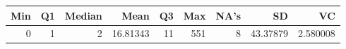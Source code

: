 
\begin{tabular}[t]{rrrrrrrrr}
\toprule
Min & Q1 & Median & Mean & Q3 & Max & NA's & SD & VC\\
\midrule
0 & 1 & 2 & 16.81343 & 11 & 551 & 8 & 43.37879 & 2.580008\\
\bottomrule
\end{tabular}